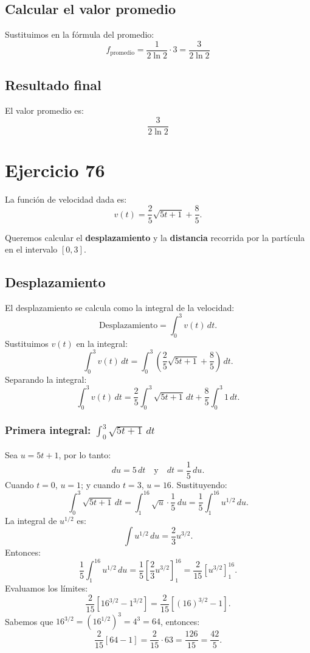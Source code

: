 \subsection*{Calcular el valor promedio}
Sustituimos en la fórmula del promedio:
\[
f_{\text{promedio}} = \frac{1}{2 \ln 2} \cdot 3 = \frac{3}{2 \ln 2}
\]

\subsection*{Resultado final}
El valor promedio es:
\[
\boxed{\frac{3}{2 \ln 2}}
\]
 \newpage 
 \section*{Ejercicio 76}

La función de velocidad dada es:
\[
v(t) = \frac{2}{5} \sqrt{5t + 1} + \frac{8}{5}.
\]

Queremos calcular el \textbf{desplazamiento} y la \textbf{distancia} recorrida por la partícula en el intervalo \( [0, 3] \).

\subsection*{Desplazamiento}

El desplazamiento se calcula como la integral de la velocidad:
\[
\text{Desplazamiento} = \int_{0}^{3} v(t) \, dt.
\]
Sustituimos \( v(t) \) en la integral:
\[
\int_{0}^{3} v(t) \, dt = \int_{0}^{3} \left( \frac{2}{5} \sqrt{5t + 1} + \frac{8}{5} \right) \, dt.
\]
Separando la integral:
\[
\int_{0}^{3} v(t) \, dt = \frac{2}{5} \int_{0}^{3} \sqrt{5t + 1} \, dt + \frac{8}{5} \int_{0}^{3} 1 \, dt.
\]

\subsubsection*{Primera integral: \( \int_{0}^{3} \sqrt{5t + 1} \, dt \)}

Sea \( u = 5t + 1 \), por lo tanto:
\[
du = 5 \, dt \quad \text{y} \quad dt = \frac{1}{5} \, du.
\]
Cuando \( t = 0 \), \( u = 1 \); y cuando \( t = 3 \), \( u = 16 \). Sustituyendo:
\[
\int_{0}^{3} \sqrt{5t + 1} \, dt = \int_{1}^{16} \sqrt{u} \cdot \frac{1}{5} \, du = \frac{1}{5} \int_{1}^{16} u^{1/2} \, du.
\]
La integral de \( u^{1/2} \) es:
\[
\int u^{1/2} \, du = \frac{2}{3} u^{3/2}.
\]
Entonces:
\[
\frac{1}{5} \int_{1}^{16} u^{1/2} \, du = \frac{1}{5} \left[ \frac{2}{3} u^{3/2} \right]_{1}^{16} = \frac{2}{15} \left[ u^{3/2} \right]_{1}^{16}.
\]
Evaluamos los límites:
\[
\frac{2}{15} \left[ 16^{3/2} - 1^{3/2} \right] = \frac{2}{15} \left[ (16)^{3/2} - 1 \right].
\]
Sabemos que \( 16^{3/2} = (16^{1/2})^3 = 4^3 = 64 \), entonces:
\[
\frac{2}{15} \left[ 64 - 1 \right] = \frac{2}{15} \cdot 63 = \frac{126}{15} = \frac{42}{5}.
\]

